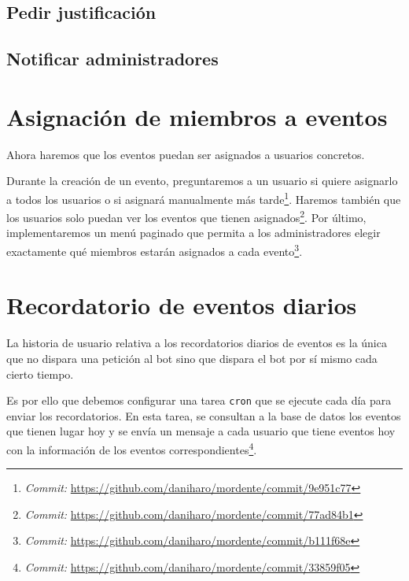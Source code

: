 \subsection{Pedir justificación}

\subsection{Notificar administradores}

\section{Asignación de miembros a eventos}

Ahora haremos que los eventos puedan ser asignados a usuarios concretos.

Durante la creación de un evento, preguntaremos a un usuario si quiere asignarlo a todos los usuarios o si asignará manualmente más tarde\footnote{\textit{Commit:} \url{https://github.com/daniharo/mordente/commit/9e951c77}}. Haremos también que los usuarios solo puedan ver los eventos que tienen asignados\footnote{\textit{Commit:} \url{https://github.com/daniharo/mordente/commit/77ad84b1}}. Por último, implementaremos un menú paginado que permita a los administradores elegir exactamente qué miembros estarán asignados a cada evento\footnote{\textit{Commit:} \url{https://github.com/daniharo/mordente/commit/b111f68e}}.

\section{Recordatorio de eventos diarios}

La historia de usuario relativa a los recordatorios diarios de eventos es la única que no dispara una petición al bot sino que dispara el bot por sí mismo cada cierto tiempo.

Es por ello que debemos configurar una tarea \texttt{cron} que se ejecute cada día para enviar los recordatorios. En esta tarea, se consultan a la base de datos los eventos que tienen lugar hoy y se envía un mensaje a cada usuario que tiene eventos hoy con la información de los eventos correspondientes\footnote{\textit{Commit:} \url{https://github.com/daniharo/mordente/commit/33859f05}}.




